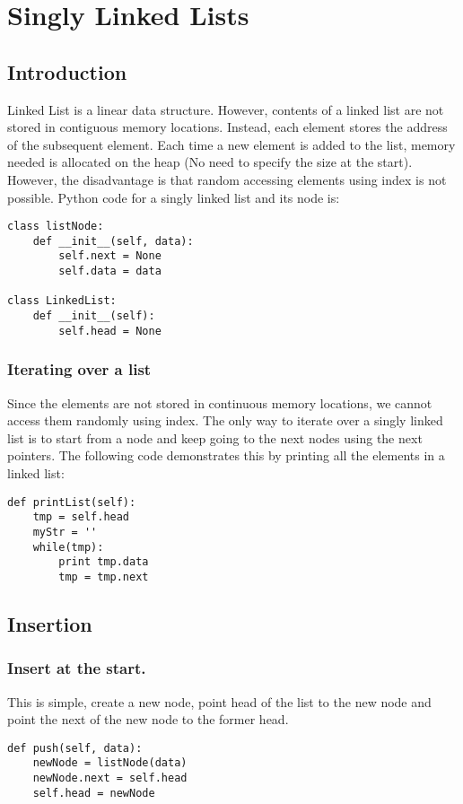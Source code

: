 \chapter{Singly Linked Lists}


\section{Introduction}

Linked List is a linear data structure. However, contents of a linked list are not stored in contiguous memory locations. Instead, each element stores the address of the subsequent element. Each time a new element is added to the list, memory needed is allocated on the heap (No need to specify the size at the start). However, the disadvantage is that random accessing elements using index is not possible. Python code for a singly linked list and its node is:
\begin{lstlisting}
class listNode:
    def __init__(self, data):
        self.next = None 
        self.data = data 

class LinkedList:
    def __init__(self):
        self.head = None
\end{lstlisting}

\subsection{Iterating over a list}
Since the elements are not stored in continuous memory locations, we cannot access them randomly using index. The only way to iterate over a singly linked list is to start from a node and keep going to the next nodes using the next pointers. The following code demonstrates this by printing all the elements in a linked list:
\begin{lstlisting}
def printList(self):
    tmp = self.head
    myStr = ''
    while(tmp):
        print tmp.data
        tmp = tmp.next
\end{lstlisting}


\section{Insertion}
\subsection{Insert at the start.}
This is simple, create a new node, point head of the list to the new node and point the next of the new node to the former head.
\begin{lstlisting}
def push(self, data):
    newNode = listNode(data)
    newNode.next = self.head
    self.head = newNode
\end{lstlisting}

